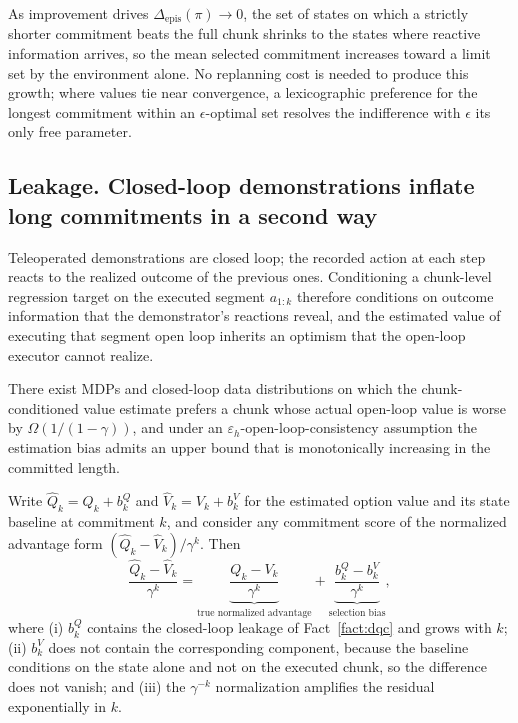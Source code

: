 \begin{corollary}[Curriculum]
\label{cor:curriculum}
As improvement drives $\Delta_{\mathrm{epis}}(\pi)\to0$, the set of states on which a strictly
shorter commitment beats the full chunk shrinks to the states where reactive information arrives,
so the mean selected commitment increases toward a limit set by the environment alone. No
replanning cost is needed to produce this growth; where values tie near convergence, a
lexicographic preference for the longest commitment within an $\epsilon$-optimal set resolves the
indifference with $\epsilon$ its only free parameter.
\end{corollary}

\subsection{Leakage. Closed-loop demonstrations inflate long commitments in a second way}
\label{app:leakage}

Teleoperated demonstrations are closed loop; the recorded action at each step reacts to the
realized outcome of the previous ones. Conditioning a chunk-level regression target on the
executed segment $a_{1:k}$ therefore conditions on outcome information that the demonstrator's
reactions reveal, and the estimated value of executing that segment open loop inherits an optimism
that the open-loop executor cannot realize.

\begin{fact}
\label{fact:dqc}
There exist MDPs and closed-loop data distributions on which the chunk-conditioned value estimate
prefers a chunk whose actual open-loop value is worse by $\Omega\!\left(1/(1-\gamma)\right)$, and
under an $\varepsilon_h$-open-loop-consistency assumption the estimation bias admits an upper
bound that is monotonically increasing in the committed length.
\end{fact}

\begin{proposition}
\label{prop:leakage}
Write $\widehat Q_k=Q_k+b^{Q}_{k}$ and $\widehat V_k=V_k+b^{V}_{k}$ for the estimated option value
and its state baseline at commitment $k$, and consider any commitment score of the normalized
advantage form $(\widehat Q_k-\widehat V_k)/\gamma^{k}$. Then
\[
\frac{\widehat Q_k-\widehat V_k}{\gamma^{k}}
=\underbrace{\frac{Q_k-V_k}{\gamma^{k}}}_{\text{true normalized advantage}}
+\underbrace{\frac{b^{Q}_{k}-b^{V}_{k}}{\gamma^{k}}}_{\text{selection bias}},
\]
where (i) $b^{Q}_{k}$ contains the closed-loop leakage of Fact~\ref{fact:dqc} and grows with $k$;
(ii) $b^{V}_{k}$ does not contain the corresponding component, because the baseline conditions on
the state alone and not on the executed chunk, so the difference does not vanish; and (iii) the
$\gamma^{-k}$ normalization amplifies the residual exponentially in $k$.
\end{proposition}

